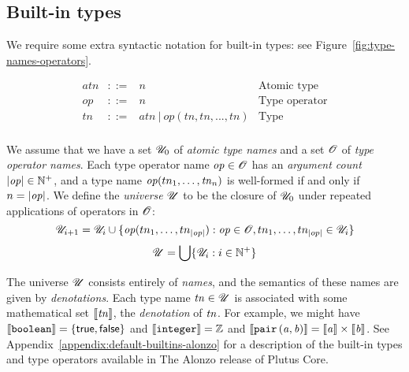 \subsection{Built-in types}
\label{sec:built-in-types}
We require some extra syntactic notation for built-in types: see Figure~\ref{fig:type-names-operators}.

\begin{minipage}{\linewidth}
    \centering
    \[\begin{array}{rclr}
    \mathit{atn}    & ::= & n & \textrm{Atomic type}\\
     op             & ::= & n & \textrm{Type operator}\\
     tn             & ::= & \mathit{atn} \ | \ op(tn,tn,...,tn) & \textrm{Type}\\
    \end{array}\]
    \label{fig:type-names-operators}
\end{minipage}

\medskip
\noindent
We assume that we have a set $\mathscr{U}_0$ of \textit{atomic type names} and a set
$\mathscr{O}$ of \textit{type operator names}.  Each type operator name $\mathit{op} \in
\mathscr{O}$ has an \textit{argument count} $\left| \mathit{op} \right| \in \mathbb{N}^{+}$, and a type name
$\mathit{op}(tn_1, \ldots, \mathit{tn}_n)$ is well-formed if and only if $n = \left| \mathit{op} \right|$.
We define the \textit{universe} $\mathscr{U}$ to be the closure of $\mathscr{U}_0$ under repeated
applications of operators in $\mathscr{O}$:
$$
\mathscr{U}_{i+1} = \mathscr{U}_i \cup \{\mathit{op}(tn_1, \ldots, tn_{\left| \mathit{op} \right|}): \mathit{op} \in \mathscr{O}, tn_1, \ldots, tn_{\left| op \right|} \in \mathscr{U}_i\}
$$
$$
\mathscr{U} = \bigcup\{\mathscr{U}_i: i \in \mathbb{N}^{+}\}
$$



The universe $\mathscr{U}$ consists entirely of \textit{names}, and the semantics of
these names are given by \textit{denotations}. Each type name $\mathit{tn} \in \mathscr{U}$ is
associated with some mathematical set $\llbracket\mathit{tn}\rrbracket$, the \textit{denotation} of
$\mathit{tn}$. For example, we might have $\llbracket\mathit{\texttt{boolean}}\rrbracket= \{\mathsf{true},
\mathsf{false}\}$ and $\llbracket\mathit{\texttt{integer}}\rrbracket = \mathbb{Z}$ and
$\llbracket\mathit{\mathtt{pair}\,\mathtt{(}a\mathtt{,}\,b\mathtt{)}}\rrbracket = \llbracket\mathit{a}\rrbracket \times \llbracket\mathit{b}\rrbracket$.  See
Appendix~\ref{appendix:default-builtins-alonzo} for a description of the built-in
types and type operators available in The Alonzo release of Plutus Core.

